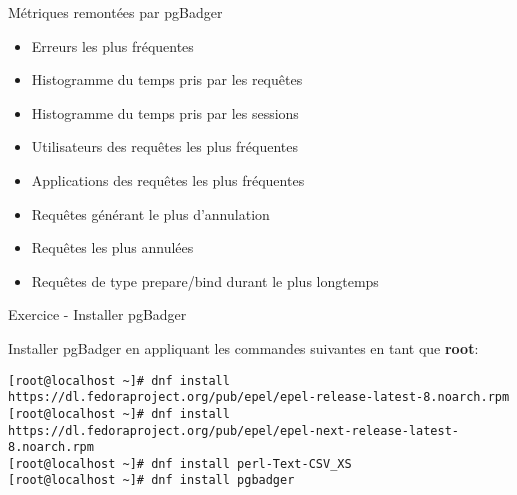 
\begin{frame}{Métriques remontées par pgBadger}

   \begin{itemize}
      \item Erreurs les plus fréquentes
      \item Histogramme du temps pris par les requêtes
      \item Histogramme du temps pris par les sessions
      \item Utilisateurs des requêtes les plus fréquentes
      \item Applications des requêtes les plus fréquentes
      \item Requêtes générant le plus d'annulation
      \item Requêtes les plus annulées
      \item Requêtes de type prepare/bind durant le plus longtemps
   \end{itemize}

\end{frame}


\begin{frame}[fragile]{Exercice - Installer pgBadger}

   Installer pgBadger en appliquant les commandes suivantes en tant que \textbf{root}:


\begin{tiny}
\begin{Verbatim}[commandchars=\&\{\}]
[root@localhost ~]# dnf install https://dl.fedoraproject.org/pub/epel/epel-release-latest-8.noarch.rpm
[root@localhost ~]# dnf install https://dl.fedoraproject.org/pub/epel/epel-next-release-latest-8.noarch.rpm
[root@localhost ~]# dnf install perl-Text-CSV_XS
[root@localhost ~]# dnf install pgbadger
\end{Verbatim}
\end{tiny}

\end{frame}


